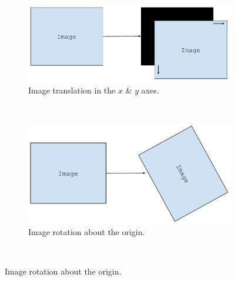 \begin{center}
  \begin{figure}[H]
      \begin{subfigure}[b]{0.45\textwidth}
        \centering
            \includegraphics[width=\textwidth]{Chapter1/lit-review-img/translation.pdf}
          \caption{Image translation in the $x$ \& $y$ axes.}
          \label{fig:translation}
      \end{subfigure} \hfill
      ~ %
      \begin{subfigure}[b]{0.45\textwidth}
          \centering
          \includegraphics[width=\textwidth]{Chapter1/lit-review-img/rotation.pdf}
          \caption{Image rotation about the origin.}
          \label{fig:rotation}
      \end{subfigure}
      ~ %


\end{figure}
\end{center}
